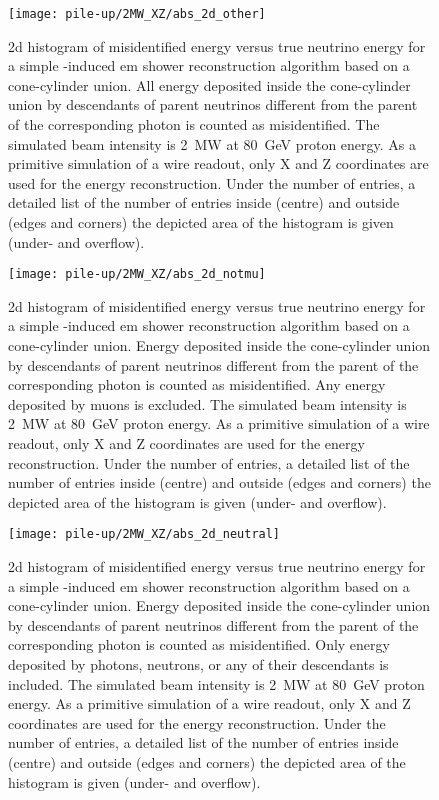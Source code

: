 \begin{figure}[htb]
	\centering
	\texttt{[image: pile-up/2MW\_XZ/abs\_2d\_other]}
	\caption{\gls{2d} histogram of misidentified energy versus true neutrino energy for a simple \Pgpz-induced \gls{em} shower reconstruction algorithm based on a cone-cylinder union.
		All energy deposited inside the cone-cylinder union by descendants of parent neutrinos different from the parent of the corresponding \Pgpz photon is counted as misidentified.
		The simulated beam intensity is \SI{2}{\mega\watt} at \SI{80}{\giga\electronvolt} proton energy.
		As a primitive simulation of a wire readout, only X and Z coordinates are used for the energy reconstruction.
		Under the number of entries, a detailed list of the number of entries inside (centre) and outside (edges and corners) the depicted area of the histogram is given (under- and overflow).}
\end{figure}

\begin{figure}[htb]
	\centering
	\texttt{[image: pile-up/2MW\_XZ/abs\_2d\_notmu]}
	\caption{\gls{2d} histogram of misidentified energy versus true neutrino energy for a simple \Pgpz-induced \gls{em} shower reconstruction algorithm based on a cone-cylinder union.
		Energy deposited inside the cone-cylinder union by descendants of parent neutrinos different from the parent of the corresponding \Pgpz photon is counted as misidentified.
		Any energy deposited by muons is excluded.
		The simulated beam intensity is \SI{2}{\mega\watt} at \SI{80}{\giga\electronvolt} proton energy.
		As a primitive simulation of a wire readout, only X and Z coordinates are used for the energy reconstruction.
		Under the number of entries, a detailed list of the number of entries inside (centre) and outside (edges and corners) the depicted area of the histogram is given (under- and overflow).}
\end{figure}

\begin{figure}[htb]
	\centering
	\texttt{[image: pile-up/2MW\_XZ/abs\_2d\_neutral]}
	\caption{\gls{2d} histogram of misidentified energy versus true neutrino energy for a simple \Pgpz-induced \gls{em} shower reconstruction algorithm based on a cone-cylinder union.
		Energy deposited inside the cone-cylinder union by descendants of parent neutrinos different from the parent of the corresponding \Pgpz photon is counted as misidentified.
		Only energy deposited by photons, neutrons, or any of their descendants is included.
		The simulated beam intensity is \SI{2}{\mega\watt} at \SI{80}{\giga\electronvolt} proton energy.
		As a primitive simulation of a wire readout, only X and Z coordinates are used for the energy reconstruction.
		Under the number of entries, a detailed list of the number of entries inside (centre) and outside (edges and corners) the depicted area of the histogram is given (under- and overflow).}
\end{figure}

